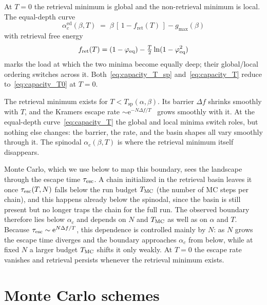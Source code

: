 \documentclass[letterpaper]{article} %
\newcommand{\e}{{\mathrm{e}}}
\newcommand{\Bnet}{\beta}
\newcommand{\fret}{f_{\mathrm{ret}}}
\newcommand{\ac}{\alpha_c}
\newcommand{\acEd}{\alpha_c^{\mathrm{ed}}}
\begin{document}
At $T = 0$ the retrieval minimum is global and the non-retrieval minimum is local. The equal-depth curve
\begin{equation}
    \acEd(\Bnet, T) \;=\; \Bnet\,[\,1 - \fret(T)\,] - g_{\max}(\Bnet)
    \label{eq:capacity_T}
\end{equation}
with retrieval free energy
\begin{equation}
    \fret(T) = (1 - \varphi_{\rm eq}) - \tfrac{T}{2}\ln(1 - \varphi_{\rm eq}^2)
\end{equation}
marks the load at which the two minima become equally deep; their global/local ordering switches across it. Both~\eqref{eq:capacity_T_sp} and~\eqref{eq:capacity_T} reduce to~\eqref{eq:capacity_T0} at $T = 0$.


The retrieval minimum exists for $T < T_{\mathrm{sp}}(\alpha, \Bnet)$. Its barrier $\Delta f$ shrinks smoothly with $T$, and the Kramers escape rate $\sim \e^{-N \Delta f / T}$~\citep{kramers1940, hanggi1990} grows smoothly with it. At the equal-depth curve~\eqref{eq:capacity_T} the global and local minima switch roles, but nothing else changes: the barrier, the rate, and the basin shapes all vary smoothly through it. The spinodal $\ac(\Bnet, T)$ is where the retrieval minimum itself disappears.

Monte Carlo, which we use below to map this boundary, sees the landscape through the escape time $\tau_{\rm esc}$. A chain initialized in the retrieval basin leaves it once $\tau_{\rm esc}(T, N)$ falls below the run budget $T_{\rm MC}$ (the number of MC steps per chain), and this happens already below the spinodal, since the basin is still present but no longer traps the chain for the full run. The observed boundary therefore lies below $\ac$ and depends on $N$ and $T_{\rm MC}$ as well as on $\alpha$ and $T$. Because $\tau_{\rm esc} \sim \e^{N\Delta f/T}$, this dependence is controlled mainly by $N$: as $N$ grows the escape time diverges and the boundary approaches $\ac$ from below, while at fixed $N$ a larger budget $T_{\rm MC}$ shifts it only weakly. At $T = 0$ the escape rate vanishes and retrieval persists whenever the retrieval minimum exists.


\section{Monte Carlo schemes}
\label{sec:mc}
\end{document}
